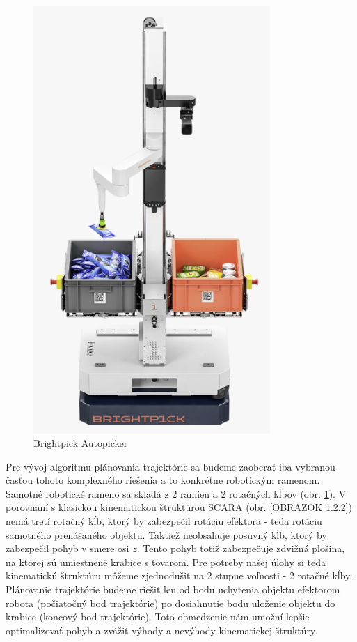 \begin{figure}[h!]
	\centering
	\includegraphics[width=90mm]{img/autopicker.png}
	\caption{Brightpick Autopicker }\label{OBRAZOK 1.2.1} 
\end{figure} 

Pre vývoj algoritmu plánovania trajektórie sa budeme zaoberať iba vybranou časťou tohoto komplexného riešenia a to konkrétne robotickým ramenom. Samotné robotické rameno sa skladá z 2 ramien a 2 rotačných kĺbov (obr. \ref{OBRAZOK 1.2.1}).  V porovnaní s klasickou kinematickou štruktúrou SCARA (obr. \ref{OBRAZOK 1.2.2}) nemá tretí rotačný kĺb, ktorý by zabezpečil rotáciu efektora - teda rotáciu samotného prenášaného objektu. Taktiež neobsahuje posuvný kĺb, ktorý by zabezpečil pohyb v smere osi $z$. Tento pohyb totiž zabezpečuje zdvižná plošina, na ktorej sú umiestnené krabice s tovarom. Pre potreby našej úlohy si teda kinematickú štruktúru môžeme zjednodušiť na 2 stupne voľnosti - 2 rotačné kĺby. Plánovanie trajektórie budeme riešiť len od bodu uchytenia objektu efektorom robota (počiatočný bod trajektórie) po dosiahnutie bodu uloženie objektu do krabice (koncový bod trajektórie). Toto obmedzenie nám umožní lepšie optimalizovať pohyb a zvážiť výhody a nevýhody kinematickej štruktúry.

